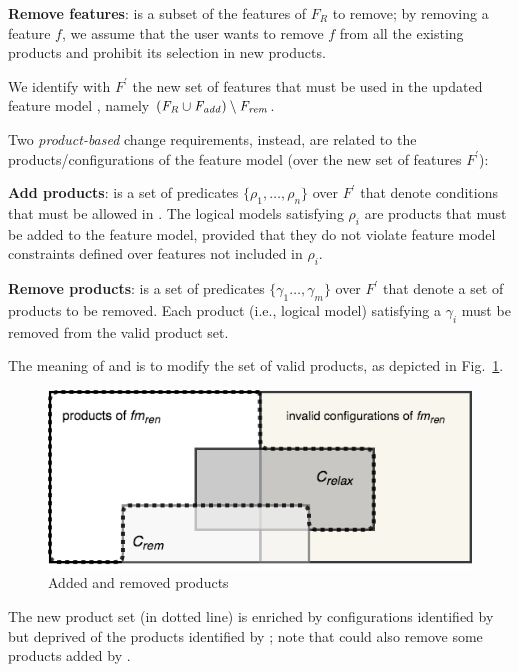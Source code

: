 \begin{tikzborder}{\cite{Gargantini16:validation}}
\begin{tikzborder}{\cite{gargantini_combinatorial_2017}}
\begin{tikzborder}{\cite{garn2019}}
\begin{tikzborder}{\cite{arcaini2019achieving}}
\begin{mydef}
\begin{compactitem}
			\item {\bf Remove features}: \Frem is a subset of the features of $F_R$ to remove; by removing a feature $f$, we assume that the user wants to remove $f$ from all the existing products and prohibit its selection in new products.
		\end{compactitem}
		We identify with $F^\prime$ the new set of features that must be used in the updated feature model \fmp, namely $(\mathit{F_R} \cup \mathit{F_{add}}) \setminus \mathit{F_{rem}}$.
		
		Two \emph{product-based} change requirements, instead, are related to the products/configurations of the feature model (over the new set of features $F^\prime$):
		\begin{compactitem}
			\item {\bf Add products}: \CFrelax is a set of predicates $\{ \rho_1, \ldots, \rho_n\}$ over $F^\prime$ that denote conditions that must be allowed in \fmp. The logical models satisfying $\rho_i$ are products that must be added to the feature model, provided that they do not violate feature model constraints defined over features not included in $\rho_i$.
			\item {\bf Remove products}: \CFrem is a set of predicates $\{ \gamma_1 \ldots, \gamma_m\}$ over $F^\prime$ that denote a set of products to be removed. Each product (i.e., logical model) satisfying a $\gamma_i$ must be removed from the valid product set.
		\end{compactitem}
	\end{mydef}
	
	The meaning of \CFrelax and \CFrem is to modify the set of valid products, as depicted in Fig.~\ref{fig:cremcrelax}.
	\be
	\begin{figure}[!htb]
		\begin{center}
			\includegraphics[width=.8\textwidth]{images/CremCrelax}
		\end{center}
		\caption{Added and removed products}
		\label{fig:cremcrelax}
	\end{figure}
	\bb The new product set (in dotted line) is enriched by configurations identified by \CFrelax but deprived of the products identified by \CFrem; note that \CFrem could also remove some products added by \CFrelax.
	

\end{tikzborder}
\end{tikzborder}
\end{tikzborder}
\end{tikzborder}
